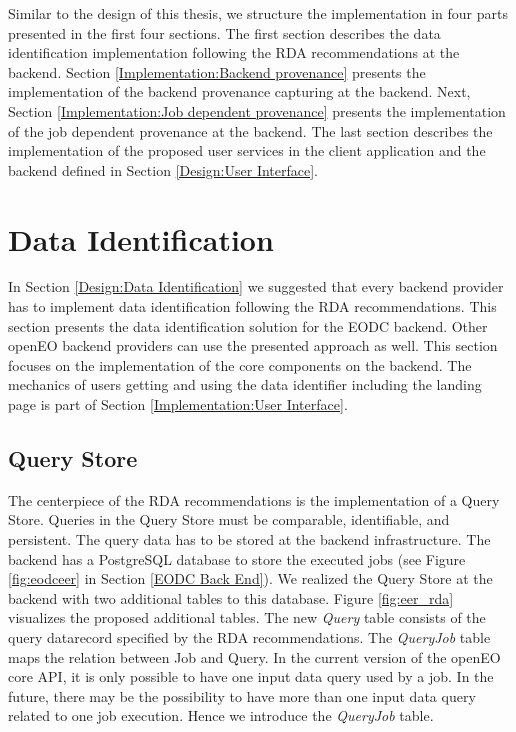\documentclass[draft,final]{vutinfth} %
\begin{document}
Similar to the design of this thesis, we structure the implementation in four parts presented in the first four sections. The first section describes the data identification implementation following the RDA recommendations at the backend. Section \ref{Implementation:Backend provenance} presents the implementation of the backend provenance capturing at the backend. Next, Section \ref{Implementation:Job dependent provenance} presents the implementation of the job dependent provenance at the backend. The last section describes the implementation of the proposed user services in the client application and the backend defined in Section \ref{Design:User Interface}.     

\section{Data Identification}\label{Implementation:Data Identification}

In Section \ref{Design:Data Identification} we suggested that every backend provider has to implement data identification following the RDA recommendations. This section presents the data identification solution for the EODC backend. Other openEO backend providers can use the presented approach as well. This section focuses on the implementation of the core components on the backend. The mechanics of users getting and using the data identifier including the landing page is part of Section \ref{Implementation:User Interface}. \\

\subsection{Query Store}
The centerpiece of the RDA recommendations is the implementation of a Query Store. Queries in the Query Store must be comparable, identifiable, and persistent. The query data has to be stored at the backend infrastructure. The backend has a PostgreSQL database to store the executed jobs (see Figure \ref{fig:eodceer} in Section \ref{EODC Back End}). We realized the Query Store at the backend with two additional tables to this database. Figure \ref{fig:eer_rda} visualizes the proposed additional tables. The new \textit{Query} table consists of the query datarecord specified by the RDA recommendations. The \textit{QueryJob} table maps the relation between Job and Query. In the current version of the openEO core API, it is only possible to have one input data query used by a job. In the future, there may be the possibility to have more than one input data query related to one job execution. Hence we introduce the \textit{QueryJob} table. 
\end{document}
